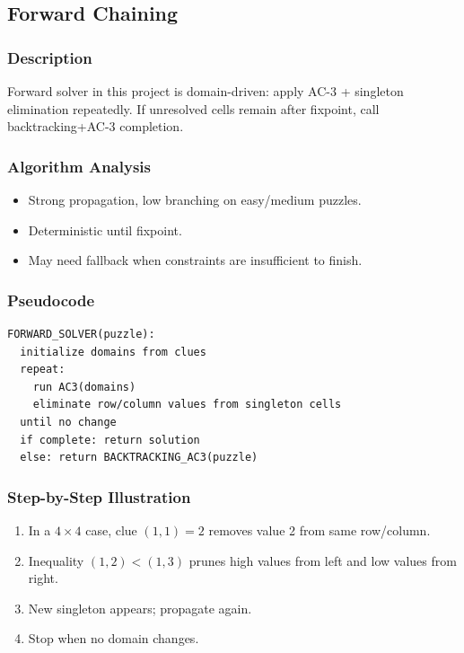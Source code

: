 \documentclass[12pt,a4paper]{article}
\begin{document}
\subsection{Forward Chaining}
\subsubsection{Description}
Forward solver in this project is domain-driven: apply AC-3 + singleton elimination repeatedly.
If unresolved cells remain after fixpoint, call backtracking+AC-3 completion.

\subsubsection{Algorithm Analysis}
\begin{itemize}
    \item Strong propagation, low branching on easy/medium puzzles.
    \item Deterministic until fixpoint.
    \item May need fallback when constraints are insufficient to finish.
\end{itemize}

\subsubsection{Pseudocode}
\begin{lstlisting}[style=pseudostyle, caption={Forward Chaining}]
FORWARD_SOLVER(puzzle):
  initialize domains from clues
  repeat:
    run AC3(domains)
    eliminate row/column values from singleton cells
  until no change
  if complete: return solution
  else: return BACKTRACKING_AC3(puzzle)
\end{lstlisting}

\subsubsection{Step-by-Step Illustration}
\begin{enumerate}
    \item In a $4\times4$ case, clue $(1,1)=2$ removes value 2 from same row/column.
    \item Inequality $(1,2)<(1,3)$ prunes high values from left and low values from right.
    \item New singleton appears; propagate again.
    \item Stop when no domain changes.
\end{enumerate}
\end{document}
